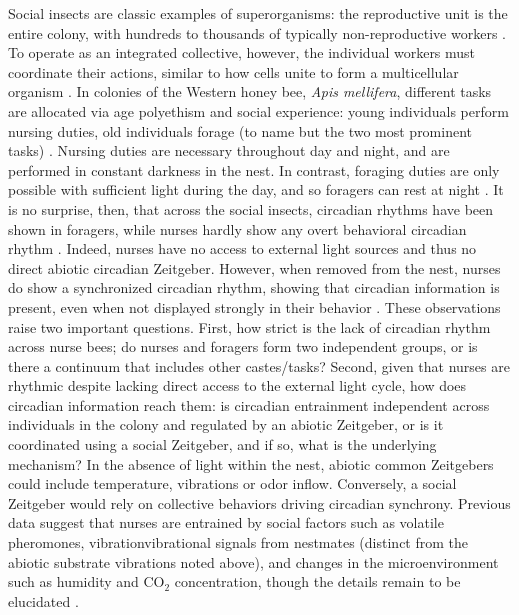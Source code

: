 \documentclass{article}
\newcommand{\added}[1]{{\color{blue}#1}}
\newcommand{\deleted}[1]{{\color{red}#1}} %
\newcommand{\replaced}[2]{\deleted{#1}\added{#2}}
\newcommand{\added}[1]{#1}
\newcommand{\deleted}[1]{}
\newcommand{\replaced}[2]{#2}
\begin{document}
Social insects are classic examples of superorganisms: the reproductive unit is the entire colony, with hundreds to thousands of typically non-reproductive workers \cite{holldobler_superorganism_2009}. To operate as an integrated collective, however, the individual workers must coordinate their actions, similar to how cells unite to form a multicellular organism \cite{smith_major_1997}. In colonies of the Western honey bee, \textit{Apis mellifera}, different tasks are allocated via age polyethism and social experience: young individuals perform nursing duties, old individuals forage (to name but the two most prominent tasks) \cite{seeley_adaptive_1982, wild_social_2021}. Nursing duties are necessary throughout day and night, and are performed in constant darkness in the nest. In contrast, foraging duties are only possible with sufficient light during the day, and so foragers can rest at night \cite{klein_caste-dependent_2008, klein_sleep_2010}. It is no surprise, then, that across the social insects, circadian rhythms have been shown in foragers, while nurses hardly show any \added{overt behavioral} circadian rhythm \cite{crailsheim_diurnal_1996, moore_timekeeping_1998, toma_changes_2000, shemesh_natural_2007, shemesh_molecular_2010, bloch_reversal_2001, fujioka2017ant, mildner2017plasticity, eban2011maternity}.
Indeed, nurses have no access to external light sources and thus no direct abiotic circadian Zeitgeber. However, when removed from the nest, nurses do show a synchronized circadian rhythm, showing that circadian information is present, even when not displayed strongly in their behavior \cite{fuchikawa_potent_2016, shemesh_natural_2007, shemesh_molecular_2010, siehler_remarkable_2021}. These observations raise two important questions. First, how strict is the lack of circadian rhythm across nurse bees; do nurses and foragers form two independent groups, or is there a continuum that includes other castes/tasks? Second, \added{given that nurses are rhythmic despite lacking direct access to the external light cycle, how does circadian information reach them:} is circadian entrainment independent across individuals in the colony and regulated by an abiotic Zeitgeber, or is it coordinated using a social Zeitgeber, and if so, what is the underlying mechanism? In the absence of light within the nest, abiotic common Zeitgebers could include temperature, vibrations or odor inflow. Conversely, a social Zeitgeber would rely on collective behaviors driving circadian synchrony. Previous data suggest that nurses are entrained by social factors such as volatile pheromones, \replaced{vibration}{vibrational signals from nestmates (distinct from the abiotic substrate vibrations noted above)}, and changes in the microenvironment such as humidity and CO$_2$ concentration, though the details remain to be elucidated \cite{fuchikawa_potent_2016}.
\end{document}
